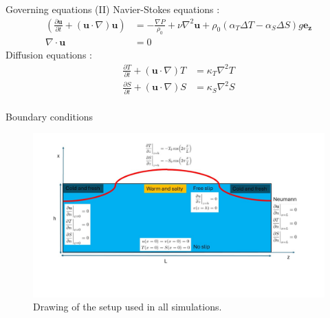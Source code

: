 \documentclass[10pt]{beamer}
\begin{document}
\begin{frame}{Governing equations (II)}
Navier-Stokes equations :
\begin{equation}
  \begin{aligned}
    \left(\frac{\partial\mathbf{u}}{\partial t} + (\mathbf{u}\cdot\nabla)\mathbf{u}\right) & = -\frac{\nabla P}{\rho _0} + \nu\nabla^2\mathbf{u} + \rho_0\left(\alpha_T \Delta T - \alpha_S \Delta S \right) g\mathbf{e_z} \\
    \nabla\cdot\mathbf{u}& = 0  \end{aligned}
\end{equation}
Diffusion equations :
\begin{equation}
    \begin{aligned}
        \frac{\partial T}{\partial t} + (\mathbf{u}\cdot\nabla)T                                   & = \kappa_T \nabla^2T                                      \\
    \frac{\partial S}{\partial t} + (\mathbf{u}\cdot\nabla)S                                   & = \kappa_S \nabla^2S                                      \\    
    \end{aligned}
\end{equation}


\end{frame}
\begin{frame}{Boundary conditions}
\begin{figure}[ht]
  \centering
  \includegraphics[width=1.\textwidth]{images/drawing_setup.jpg}
  \caption{Drawing of the setup used in all simulations.}
  \label{fig:setup}
\end{figure}
\end{frame}
\end{document}
